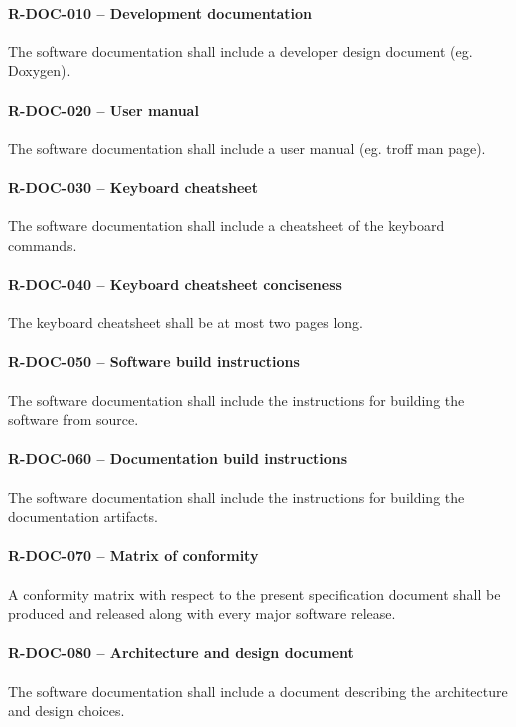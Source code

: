 \paragraph{R-DOC-010 -- Development documentation}
The software documentation shall include a developer design document (eg.
Doxygen).

\paragraph{R-DOC-020 -- User manual}
The software documentation shall include a user manual (eg. troff man page).

\paragraph{R-DOC-030 -- Keyboard cheatsheet}
The software documentation shall include a cheatsheet of the keyboard commands.

\paragraph{R-DOC-040 -- Keyboard cheatsheet conciseness}
The keyboard cheatsheet shall be at most two pages long.

\paragraph{R-DOC-050 -- Software build instructions}
The software documentation shall include the instructions for building
the software from source.

\paragraph{R-DOC-060 -- Documentation build instructions}
The software documentation shall include the instructions for building
the documentation artifacts.

\paragraph{R-DOC-070 -- Matrix of conformity}
A conformity matrix with respect to the present specification document shall
be produced and released along with every major software release.

\paragraph{R-DOC-080 -- Architecture and design document}
The software documentation shall include a document describing the architecture
and design choices.

